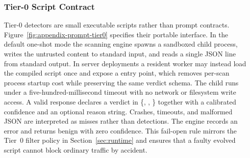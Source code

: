 \subsubsection{Tier-0 Script Contract}
\label{app:prompts-tier0}



Tier-0 detectors are small executable scripts rather than prompt
contracts.
Figure~\ref{fig:appendix-prompt-tier0} specifies their portable
interface.
In the default one-shot mode the scanning engine spawns a sandboxed
child process, writes the untrusted content to standard input, and reads
a single JSON line from standard output.
In server deployments a resident worker may instead load the compiled
script once and expose a  entry point, which
removes per-scan process startup cost while preserving the same verdict
schema.
The child runs under a five-hundred-millisecond timeout with no network
or filesystem write access.
A valid response declares a verdict in
\{, , \} together
with a calibrated confidence and an optional reason string.
Crashes, timeouts, and malformed JSON are interpreted as misses rather
than detections.
The engine records an error and returns benign with zero confidence.
This fail-open rule mirrors the Tier~0 filter policy in
Section~\ref{sec:runtime} and ensures that a faulty evolved script
cannot block ordinary traffic by accident.
